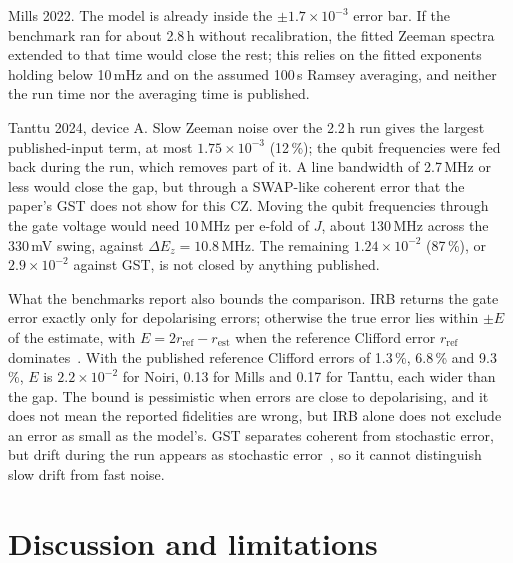 \documentclass[reprint,aps,pra,floatfix,superscriptaddress,longbibliography,nofootinbib]{revtex4-2}
\newcommand{\dEz}{\Delta E_z}
\newcommand{\ee}[2]{#1\times10^{#2}}
\begin{document}
Mills 2022. The model is already inside the $\pm\ee{1.7}{-3}$ error bar. If the benchmark ran for about 2.8\,h without recalibration, the fitted Zeeman spectra extended to that time would close the rest; this relies on the fitted exponents holding below 10\,mHz and on the assumed 100\,s Ramsey averaging, and neither the run time nor the averaging time is published.

Tanttu 2024, device A. Slow Zeeman noise over the 2.2\,h run gives the largest published-input term, at most $\ee{1.75}{-3}$ (12\,\%); the qubit frequencies were fed back during the run, which removes part of it. A line bandwidth of 2.7\,MHz or less would close the gap, but through a SWAP-like coherent error that the paper's GST does not show for this CZ. Moving the qubit frequencies through the gate voltage would need 10\,MHz per e-fold of $J$, about 130\,MHz across the 330\,mV swing, against $\dEz=10.8$\,MHz. The remaining $\ee{1.24}{-2}$ (87\,\%), or $\ee{2.9}{-2}$ against GST, is not closed by anything published.

What the benchmarks report also bounds the comparison. IRB returns the gate error exactly only for depolarising errors; otherwise the true error lies within $\pm E$ of the estimate, with $E = 2r_\mathrm{ref}-r_\mathrm{est}$ when the reference Clifford error $r_\mathrm{ref}$ dominates~\cite{magesan2012}. With the published reference Clifford errors of 1.3\,\%, 6.8\,\% and 9.3\,\%, $E$ is $\ee{2.2}{-2}$ for Noiri, 0.13 for Mills and 0.17 for Tanttu, each wider than the gap. The bound is pessimistic when errors are close to depolarising, and it does not mean the reported fidelities are wrong, but IRB alone does not exclude an error as small as the model's. GST separates coherent from stochastic error, but drift during the run appears as stochastic error~\cite{tanttu2024}, so it cannot distinguish slow drift from fast noise.

\section{Discussion and limitations}
\label{sec:discussion}
\end{document}
